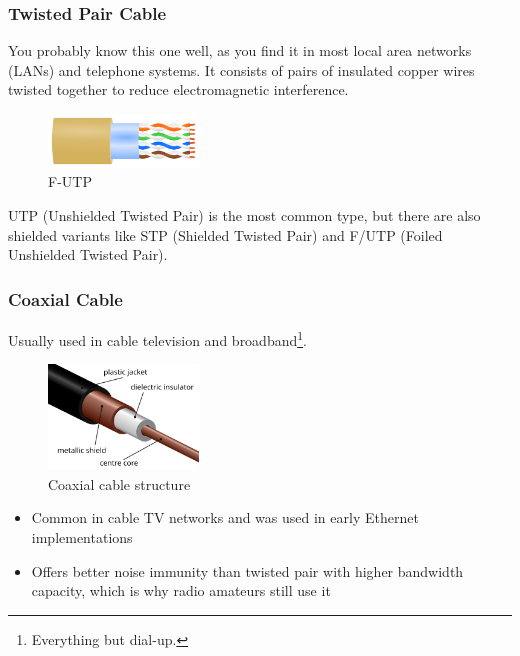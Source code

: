 \subsubsection*{Twisted Pair Cable}
You probably know this one well, as you find it in most local area networks (LANs) and telephone systems. It consists of pairs of insulated copper wires twisted together to reduce electromagnetic interference.

\begin{figure}[h]
    \centering
    \includegraphics[width=4cm]{assets/osi/physical/f-utp.png}
    \caption{F-UTP}\label{fig:twisted_pair}
\end{figure}

UTP (Unshielded Twisted Pair) is the most common type, but there are also shielded variants like STP (Shielded Twisted Pair) and F/UTP (Foiled Unshielded Twisted Pair).

\vspace{1em}

\subsubsection*{Coaxial Cable}
Usually used in cable television and broadband\footnote{Everything but dial-up.}.

\begin{figure}[h]
    \centering
    \includegraphics[width=4cm]{assets/osi/physical/coax.png}
    \caption{Coaxial cable structure}\label{fig:coaxial_cable}
\end{figure}

\begin{itemize}
    \item Common in cable TV networks and was used in early Ethernet implementations
    \item Offers better noise immunity than twisted pair with higher bandwidth capacity, which is why radio amateurs still use it
\end{itemize}

\vspace{1em}


